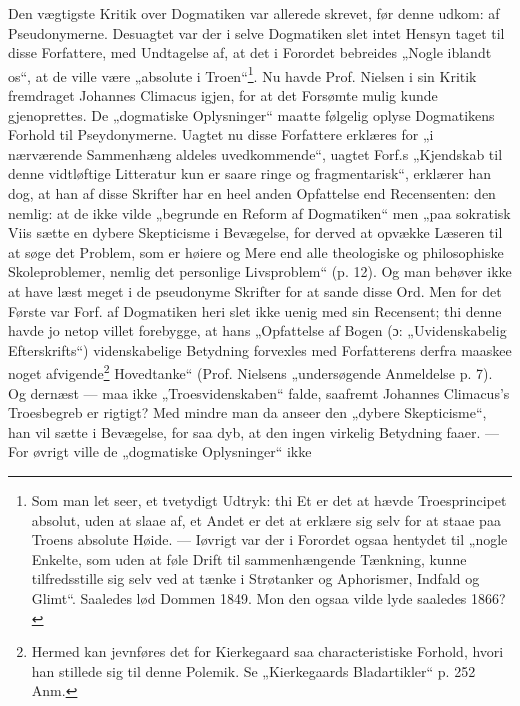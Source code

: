 \documentclass[12pt,a4paper]{book}
\newcommand{\opage}[1]{\marginnote{\footnotesize\textit{[#1]}}}
\begin{document}
Den vægtigste Kritik over Dogmatiken var allerede skrevet,
før denne udkom: af Pseudonymerne. Desuagtet var der i
selve Dogmatiken slet intet Hensyn taget til disse Forfattere,
med Undtagelse af, at det i Forordet bebreides „Nogle iblandt
os“, at de ville være „absolute i Troen“\footnote{Som man let seer, et tvetydigt Udtryk: thi Et er det at hævde
Troesprincipet absolut, uden at slaae af, et Andet er det at erklære
sig selv for at staae paa Troens absolute Høide. --- Iøvrigt var
der i Forordet ogsaa hentydet til „nogle Enkelte, som uden at føle
Drift til sammenhængende Tænkning, kunne tilfredsstille sig selv ved
at tænke i Strøtanker og Aphorismer, Indfald og Glimt“. Saaledes
lød Dommen 1849. Mon den ogsaa vilde lyde saaledes 1866?}. Nu havde Prof.
Nielsen i sin Kritik fremdraget Johannes Climacus igjen, for
at det Forsømte mulig kunde gjenoprettes. De „dogmatiske
Oplysninger“ maatte følgelig oplyse Dogmatikens Forhold til
Pseydonymerne. Uagtet nu disse Forfattere erklæres for „i
nærværende Sammenhæng aldeles uvedkommende“, uagtet Forf.s
\opage{32}\setcounter{footnote}{0}%
„Kjendskab til denne vidtløftige Litteratur kun er saare ringe
og fragmentarisk“, erklærer han dog, at han af disse Skrifter
har en heel anden Opfattelse end Recensenten: den nemlig: at
de ikke vilde „begrunde en Reform af Dogmatiken“ men „paa
sokratisk Viis sætte en dybere Skepticisme i Bevægelse, for
derved at opvække Læseren til at søge det Problem, som er
høiere og Mere end alle theologiske og philosophiske Skoleproblemer,
nemlig det personlige Livsproblem“ (p. 12). Og
man behøver ikke at have læst meget i de pseudonyme Skrifter
for at sande disse Ord. Men for det Første var Forf. af
Dogmatiken heri slet ikke uenig med sin Recensent; thi denne
havde jo netop villet forebygge, at hans „Opfattelse af Bogen
(ɔ: „Uvidenskabelig Efterskrifts“) videnskabelige Betydning forvexles
med Forfatterens derfra maaskee noget afvigende\footnote{Hermed kan jevnføres det for Kierkegaard saa characteristiske Forhold,
hvori han stillede sig til denne Polemik. Se „Kierkegaards
Bladartikler“ p. 252 Anm.}
Hovedtanke“ (Prof. Nielsens „undersøgende Anmeldelse p. 7).
Og dernæst --- maa ikke „Troesvidenskaben“ falde, saafremt
Johannes Climacus's Troesbegreb er rigtigt? Med mindre
man da anseer den „dybere Skepticisme“, han vil sætte i
Bevægelse, for saa dyb, at den ingen virkelig Betydning
faaer. --- For øvrigt ville de „dogmatiske Oplysninger“ ikke
\end{document}
